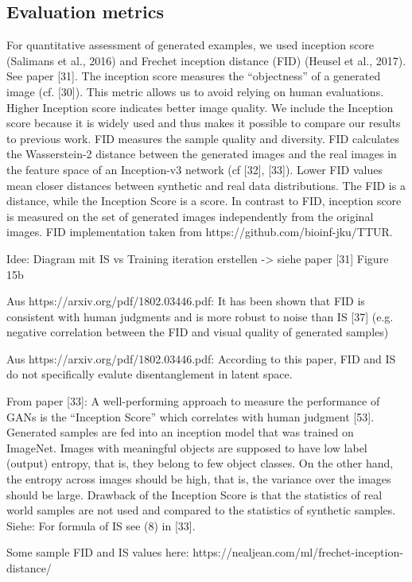 \documentclass[11pt,a4paper]{article}
\begin{document}
\subsection{Evaluation metrics}
For quantitative assessment of generated examples, we used inception score (Salimans et al., 2016)
and Frechet inception distance (FID) (Heusel et al., 2017). See paper [31]. The inception score measures the “objectness” of a generated image (cf. [30]). This metric allows us to avoid relying on human evaluations. Higher Inception score indicates better image quality. We include the Inception score because it is widely used and thus makes it
possible to compare our results to previous work. FID measures the sample quality and diversity. FID calculates the Wasserstein-2 distance between the generated images and the real images in the feature space of an Inception-v3 network (cf [32], [33]). Lower FID values mean closer distances between synthetic and real data distributions. The FID is a distance, while the Inception Score is a score. In contrast to FID, inception score is
measured on the set of generated images independently from the original images.
FID implementation taken from https://github.com/bioinf-jku/TTUR.

Idee: Diagram mit IS vs Training iteration erstellen -> siehe paper [31] Figure 15b

Aus https://arxiv.org/pdf/1802.03446.pdf: It has been shown that FID is consistent with human judgments and is more robust to noise than IS [37] (e.g. negative correlation between the FID and visual quality of generated samples)

Aus https://arxiv.org/pdf/1802.03446.pdf: According to this paper, FID and IS do not specifically evalute disentanglement in latent space.

From paper [33]: A well-performing approach to measure the performance of GANs is the
“Inception Score” which correlates with human judgment [53]. Generated samples are fed into an
inception model that was trained on ImageNet. Images with meaningful objects are supposed to
have low label (output) entropy, that is, they belong to few object classes. On the other hand, the
entropy across images should be high, that is, the variance over the images should be large. Drawback
of the Inception Score is that the statistics of real world samples are not used and compared to the
statistics of synthetic samples.
Siehe: For formula of IS see (8) in [33].
    
Some sample FID and IS values here: https://nealjean.com/ml/frechet-inception-distance/    
    
\end{document}
